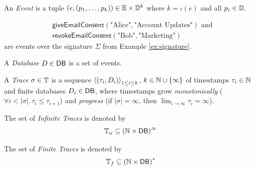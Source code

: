\begin{definition}
    \label{def:event}
    An \emph{Event} is a tuple
    $(e, \left(p_1, \dots, p_k \right) )
    \in \Events \times \Domain^{k}$
    where $k=\iota(e)$ and all $p_i \in \Domain$.
\end{definition}
\begin{example}
    \label{ex:event}
    \begin{align*}
        &\mathsf{giveEmailConsent}(\text{"Alice"}, \text{"Account Updates"})
        \text{ and } \\
        &\mathsf{revokeEmailConsent}(\text{"Bob"}, \text{"Marketing"})
    \end{align*}
    are events over the signature $\Sigma$ from Example
    \ref{ex:signature}.
\end{example}

\begin{definition}
    \label{def:database}
    A \emph{Database} $D \in \Databases$ is a set of events.
\end{definition}

\begin{definition}
    \label{def:trace}
    A \emph{Trace} $\sigma \in \Traces$ is a sequence
    $\Sequence[1 \leq i \leq k]{(\tau_i, D_i)}$, $k \in \Nat \cup \lbrace \infty \rbrace$
    of timestamps $\tau_i \in \Nat$ and finite databases $D_i \in \Databases$,
    where timestamps grow \emph{monotonically}
    ($\forall i < |\sigma|.\,\tau_i \leq \tau_{i+1}$)
    and \emph{progress}
    (if $|\sigma| = \infty$, then $\lim_{i\to\infty} \tau_i = \infty$).
\end{definition}

\begin{definition}
    \label{def:infinite-trace}
    The set of \emph{Infinite Traces} is denoted by
    \begin{equation*}
        \Traces_\omega
        \subseteq 
        \left(
        \Nat \times \Databases
        \right)^{\infty}
    \end{equation*}
\end{definition}

\begin{definition}
    \label{def:finite-trace}
    The set of \emph{Finite Traces} is denoted by
    \begin{equation*}
        \Traces_f
        \subseteq 
        \left(
        \Nat \times \Databases
        \right)^*
    \end{equation*}
\end{definition}

